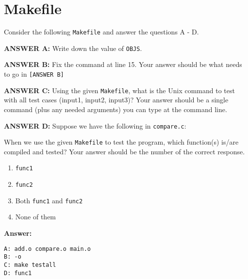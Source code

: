 \newpage

\section{Makefile}

Consider the following {\tt Makefile} and answer the questions A - D.

\resetlinenumber[1]
\linenumbers
\begin{tt}
	
\end{tt}
\nolinenumbers

\vspace{0.2in}

{\bf ANSWER A:} Write down the value of {\tt OBJS}.

\vspace{0.2in}

{\bf ANSWER B:} Fix the command at line 15. Your answer should be what needs to go in {\tt [ANSWER B]}

\vspace{0.2in}

{\bf ANSWER C:} Using the given {\tt Makefile}, what is the Unix command to test with all test cases (input1, input2, input3)? Your answer should be a single command (plus any needed arguments) you can type at the command line.

\vspace{0.2in}

{\bf ANSWER D:} Suppose we have the following in {\tt compare.c}:

\begin{tt}
	
\end{tt}
\nolinenumbers

When we use the given {\tt Makefile} to test the program, which function(s) is/are compiled and tested?
Your answer should be the number of the correct response.
\begin{enumerate}
\item {\tt func1}
\item {\tt func2}
\item Both {\tt func1} and {\tt func2}
\item None of them
\end{enumerate}


\vspace{0.2in}

\ifexam

\else

{\bf Answer:}


\begin{verbatim}
A: add.o compare.o main.o
B: -o
C: make testall
D: func1
\end{verbatim}

\fi

